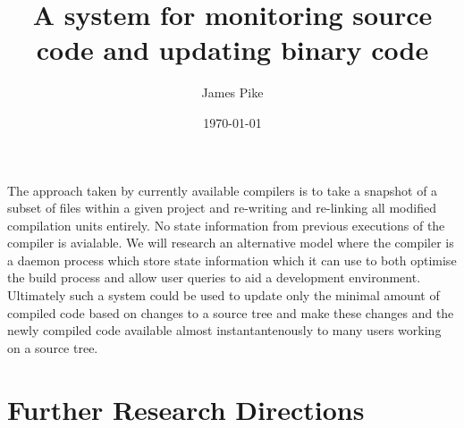 \documentclass{article}
\begin{document}
\title{A system for monitoring source code and updating binary code}
\author{James Pike}
\date{\today}

\maketitle

The approach taken by currently available compilers is to take a snapshot
of a subset of files within a given project and re-writing and re-linking all
modified compilation units entirely. No state information from previous
executions of the compiler is avialable. We will research an alternative 
model where the compiler is a daemon process which store state information 
which it can use to both optimise the build process and allow user queries to 
aid a development environment. Ultimately such a system could be used to
update only the minimal amount of compiled code based on changes to a source
tree and make these changes and the newly compiled code available almost 
instantantenously to many users working on a source tree.

\section*{Further Research Directions}




\end{document}

